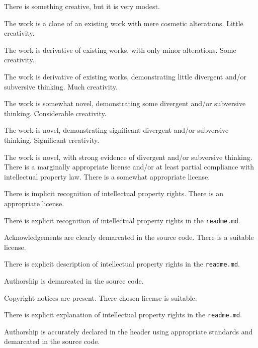 \documentclass{../../fal_assignment}
\begin{document}
\begin{markingrubric}
%
        \grade\fail There is something creative, but it is very modest.
            \par The work is a clone of an existing work with mere cosmetic alterations.
        \grade Little creativity.
            \par The work is derivative of existing works, with only minor alterations.
        \grade Some creativity.
            \par The work is derivative of existing works, demonstrating little divergent and/or subversive thinking.
        \grade Much creativity.
            \par The work is somewhat novel, demonstrating some divergent and/or subversive thinking.
        \grade Considerable creativity.
            \par The work is novel, demonstrating significant divergent and/or subversive thinking.
        \grade Significant creativity.
            \par The work is novel, with strong evidence of divergent and/or subversive thinking.
%
        \grade\fail There is a marginally appropriate license and/or at least partial compliance with intellectual property law.
        \grade There is a somewhat appropriate license.
            \par There is implicit recognition of intellectual property rights.
        \grade There is an appropriate license. 
            \par There is explicit recognition of intellectual property rights in the \texttt{readme.md}.
            \par Acknowledgements are clearly demarcated in the source code.
        \grade There is a suitable license.
            \par There is explicit description of intellectual property rights in the \texttt{readme.md}.
            \par Authorship is demarcated in the source code.
            \par Copyright notices are present.
        \grade There chosen license is suitable. 
            \par There is explicit explanation of intellectual property rights in the \texttt{readme.md}.
            \par Authorship is accurately declared in the header using appropriate standards and demarcated in the source code.

\end{markingrubric}
\end{document}
